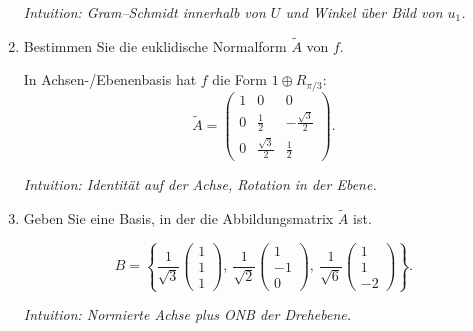 \documentclass[11pt, a4paper]{article}
\begin{document}
\begin{enumerate}
\begin{framed}
  \medskip\noindent\textit{Intuition: Gram–Schmidt innerhalb von $U$ und Winkel über Bild von $u_1$.}
  \end{framed}

  \item Bestimmen Sie die euklidische Normalform $\tilde A$ von $f$.
  \begin{framed}
  In Achsen-/Ebenenbasis hat $f$ die Form $1\oplus R_{\pi/3}$:
  \[
  \tilde A=
  \begin{pmatrix}
  1&0&0\\
  0&\tfrac12&-\tfrac{\sqrt3}{2}\\
  0&\tfrac{\sqrt3}{2}&\tfrac12
  \end{pmatrix}.
  \]

  \medskip\noindent\textit{Intuition: Identität auf der Achse, Rotation in der Ebene.}
  \end{framed}

  \item Geben Sie eine Basis, in der die Abbildungsmatrix $\tilde A$ ist.
  \begin{framed}
  \[
  B=\left\{
  \frac{1}{\sqrt3}\begin{pmatrix}1\\1\\1\end{pmatrix},\
  \frac{1}{\sqrt2}\begin{pmatrix}1\\-1\\0\end{pmatrix},\
  \frac{1}{\sqrt6}\begin{pmatrix}1\\1\\-2\end{pmatrix}
  \right\}.
  \]

  \medskip\noindent\textit{Intuition: Normierte Achse plus ONB der Drehebene.}
  \end{framed}
\end{enumerate}
\end{document}
